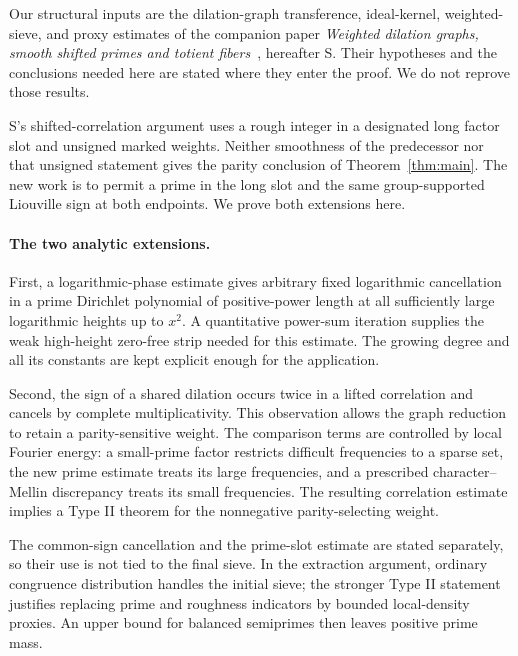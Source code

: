 \documentclass[11pt]{article}
\newcommand{\1}{\mathbf{1}}
\theoremstyle{definition}
\theoremstyle{remark}
\numberwithin{equation}{section}
\begin{document}
Our structural inputs are the dilation-graph transference, ideal-kernel,
weighted-sieve, and proxy estimates of the companion paper
\emph{Weighted dilation graphs, smooth shifted primes and totient
fibers}~\cite{SmoothShifted}, hereafter S. Their hypotheses and the
conclusions needed here are stated where they enter the proof.
We do not reprove those results.

S's shifted-correlation argument uses a rough integer in a designated
long factor slot and unsigned marked weights. Neither smoothness of
the predecessor nor that unsigned statement gives the parity conclusion
of Theorem~\ref{thm:main}. The new work is to permit a prime in the long
slot and the same group-supported Liouville sign at both endpoints.
We prove both extensions here.

\paragraph{The two analytic extensions.}
First, a logarithmic-phase estimate gives arbitrary fixed logarithmic
cancellation in a prime Dirichlet polynomial of positive-power length
at all sufficiently large logarithmic heights up to $x^2$. A
quantitative power-sum iteration supplies the weak high-height
zero-free strip needed for this estimate. The growing degree and all
its constants are kept explicit enough for the application.

Second, the sign of a shared dilation occurs twice in a lifted
correlation and cancels by complete multiplicativity. This observation
allows the graph reduction to retain a parity-sensitive weight.
The comparison terms are controlled by local Fourier energy: a
small-prime factor restricts difficult frequencies to a sparse set,
the new prime estimate treats its large frequencies, and a prescribed
character--Mellin discrepancy treats its small frequencies. The
resulting correlation estimate implies a Type II theorem for the
nonnegative parity-selecting weight.

The common-sign cancellation and the prime-slot estimate are stated
separately, so their use is not tied to the final sieve. In the
extraction argument, ordinary congruence distribution handles the
initial sieve; the stronger Type II statement justifies replacing
prime and roughness indicators by bounded local-density proxies.
An upper bound for balanced semiprimes then leaves positive prime mass.
\end{document}
